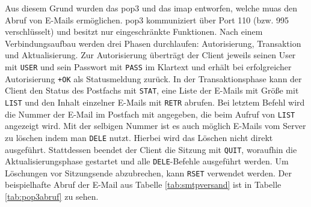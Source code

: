 \noindent Aus diesem Grund wurden das \acrfull{pop3} und das \acrfull{imap} entworfen, welche \acrshort{mua}s den Abruf von E-Mails ermöglichen. \acrshort{pop3} kommuniziert über Port 110 (bzw. 995 verschlüsselt) und besitzt nur eingeschränkte Funktionen. Nach einem Verbindungsaufbau werden drei Phasen durchlaufen: Autorisierung, Transaktion und Aktualisierung. Zur Autorisierung überträgt der Client jeweils seinen User mit \texttt{USER} und sein Passwort mit \texttt{PASS} im Klartext und erhält bei erfolgreicher Autorisierung \texttt{+OK} als Statusmeldung zurück. In der Transaktionsphase kann der Client den Status des Postfachs mit \texttt{STAT}, eine Liste der E-Mails mit Größe mit \texttt{LIST} und den Inhalt einzelner E-Mails mit \texttt{RETR} abrufen. Bei letztem Befehl wird die Nummer der E-Mail im Postfach mit angegeben, die beim Aufruf von \texttt{LIST} angezeigt wird. Mit der selbigen Nummer ist es auch möglich E-Mails vom Server zu löschen indem man \texttt{DELE} nutzt. Hierbei wird das Löschen nicht direkt ausgeführt. Stattdessen beendet der Client die Sitzung mit \texttt{QUIT}, woraufhin die Aktualisierungsphase gestartet und alle \texttt{DELE}-Befehle ausgeführt werden. Um Löschungen vor Sitzungsende abzubrechen, kann \texttt{RSET} verwendet werden. Der beispielhafte Abruf der E-Mail aus Tabelle \ref{tab:smtpversand} ist in Tabelle \ref{tab:pop3abruf} zu sehen. \citep[S. 3 ff.]{RFC1939}



